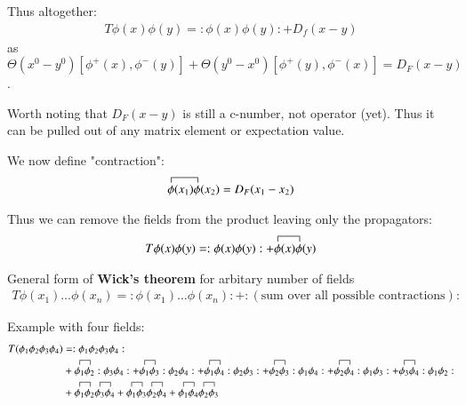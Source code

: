 Thus altogether: 
\begin{align}
	T\phi(x)\phi(y) = :\phi(x)\phi(y): + D_f(x-y)
\end{align}
as $\Theta(x^0 - y^0) [\phi^+(x), \phi^-(y)] + \Theta(y^0 - x^0) [\phi^+(y), \phi^-(x)] = D_F(x-y)$.

Worth noting that $D_F(x-y)$ is still a c-number, not operator (yet). Thus it can be pulled out of any matrix element or expectation value.

We now define "contraction":
\begin{align}
	\contraction[1ex]{}{\phi}{(x_1)}{\phi}	\phi(x_1) \phi(x_2) = D_F(x_1-x_2)
\end{align}

Thus we can remove the fields from the product leaving only the propagators:
\begin{align}
	T\phi(x)\phi(y) = :\phi(x)\phi(y): +  \contraction[1ex]{}{\phi}{(x)}{\phi}	\phi(x) \phi(y)
\end{align}

General form of \textbf{Wick's theorem} for arbitary number of fields
\begin{align}
	T\phi(x_1)\dots \phi(x_n) = :\phi(x_1)\dots \phi(x_n):	 + :\left( \text{sum over all possible contractions} \right):
\end{align}

Example with four fields:
\begin{align*}
	T(\phi_1 \phi_2 \phi_3 \phi_4) &= :\phi_1 \phi_2 \phi_3 \phi_4: \\
								   & + \contraction{}{\phi_1}{}{\phi_2} \phi_1 \phi_2 :\phi_3 \phi_4: + \contraction{}{\phi_1}{}{\phi_3} \phi_1 \phi_3 :\phi_2 \phi_4: + \contraction{}{\phi_1}{}{\phi_4} \phi_1 \phi_4 :\phi_2 \phi_3: +  \contraction{}{\phi_2}{}{\phi_3} \phi_2 \phi_3 :\phi_1 \phi_4: + \contraction{}{\phi_2}{}{\phi_4} \phi_2 \phi_4 :\phi_1 \phi_3: + \contraction{}{\phi_3}{}{\phi_4} \phi_3 \phi_4 :\phi_1 \phi_2: \\
	&+ \contraction{}{\phi_1}{}{\phi_2} \phi_1 \phi_2 \contraction{}{\phi_3}{}{\phi_4}\phi_3 \phi_4 + \contraction{}{\phi_1}{}{\phi_3} \phi_1 \phi_3 \contraction{}{\phi_2}{}{\phi_4}\phi_2 \phi_4 + \contraction{}{\phi_1}{}{\phi_4} \phi_1 \phi_4 \contraction{}{\phi_2}{}{\phi_3}\phi_2 \phi_3
\end{align*}

